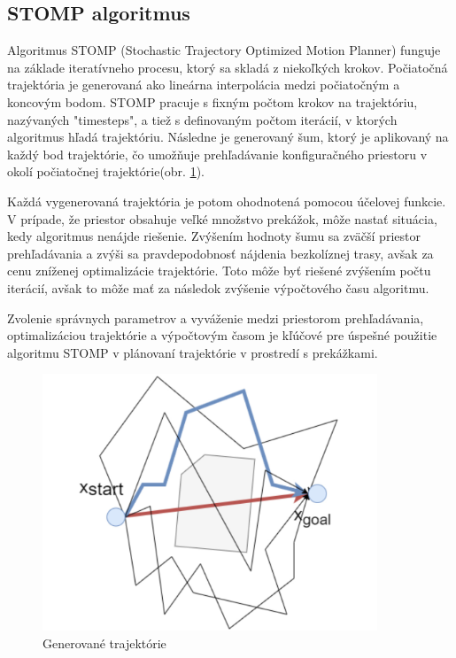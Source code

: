 \subsection{STOMP algoritmus}
\label{kap:2.5}

Algoritmus STOMP (Stochastic Trajectory Optimized Motion Planner) funguje na základe iteratívneho procesu, ktorý sa skladá z niekoľkých krokov. Počiatočná trajektória je generovaná ako lineárna interpolácia medzi počiatočným a koncovým bodom. STOMP pracuje s fixným počtom krokov na trajektóriu, nazývaných "timesteps", a tiež s definovaným počtom iterácií, v ktorých algoritmus hľadá trajektóriu. Následne je generovaný šum, ktorý je aplikovaný na každý bod trajektórie, čo umožňuje prehľadávanie konfiguračného priestoru v okolí počiatočnej trajektórie(obr. \ref{OBRAZOK 1.2.5}).

Každá vygenerovaná trajektória je potom ohodnotená pomocou účelovej funkcie. V prípade, že priestor obsahuje veľké množstvo prekážok, môže nastať situácia, kedy algoritmus nenájde riešenie. Zvýšením hodnoty šumu sa zväčší priestor prehľadávania a zvýši sa pravdepodobnosť nájdenia bezkolíznej trasy, avšak za cenu zníženej optimalizácie trajektórie. Toto môže byť riešené zvýšením počtu iterácií, avšak to môže mať za následok zvýšenie výpočtového času algoritmu.

Zvolenie správnych parametrov a vyváženie medzi priestorom prehľadávania, optimalizáciou trajektórie a výpočtovým časom je kľúčové pre úspešné použitie algoritmu STOMP v plánovaní trajektórie v prostredí s prekážkami.

\begin{figure}[h]
	\centering
	\includegraphics[width=100mm]{img/STOMP.png}
	\caption{Generované trajektórie \cite{STOMP}}\label{OBRAZOK 1.2.5} 
\end{figure} 

\begin{figure}[h]
\end{figure} 


